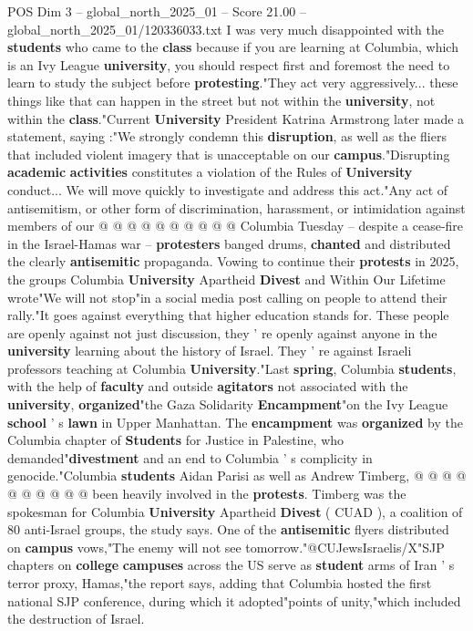 \begin{textsample}{POS Dim 3 – global\_north\_2025\_01 – Score 21.00 – global\_north\_2025\_01/120336033.txt}
I was very much disappointed with the \textbf{students} who came to the \textbf{class} because if you are learning at Columbia, which is an Ivy League \textbf{university}, you should respect first and foremost the need to learn to study the subject before \textbf{protesting}."They act very aggressively... these things like that can happen in the street but not within the \textbf{university}, not within the \textbf{class}."Current \textbf{University} President Katrina Armstrong later made a statement, saying :"We strongly condemn this \textbf{disruption}, as well as the fliers that included violent imagery that is unacceptable on our \textbf{campus}."Disrupting \textbf{academic} \textbf{activities} constitutes a violation of the Rules of \textbf{University} conduct...
We will move quickly to investigate and address this act."Any act of antisemitism, or other form of discrimination, harassment, or intimidation against members of our @ @ @ @ @ @ @ @ @ @ Columbia Tuesday -- despite a cease-fire in the Israel-Hamas war -- \textbf{protesters} banged drums, \textbf{chanted} and distributed the clearly \textbf{antisemitic} propaganda.
Vowing to continue their \textbf{protests} in 2025, the groups Columbia \textbf{University} Apartheid \textbf{Divest} and Within Our Lifetime wrote"We will not stop"in a social media post calling on people to attend their rally."It goes against everything that higher education stands for.
These people are openly against not just discussion, they ' re openly against anyone in the \textbf{university} learning about the history of Israel.
They ' re against Israeli professors teaching at Columbia \textbf{University}."Last \textbf{spring}, Columbia \textbf{students}, with the help of \textbf{faculty} and outside \textbf{agitators} not associated with the \textbf{university}, \textbf{organized}"the Gaza Solidarity \textbf{Encampment}"on the Ivy League \textbf{school} ' s \textbf{lawn} in Upper Manhattan.
The \textbf{encampment} was \textbf{organized} by the Columbia chapter of \textbf{Students} for Justice in Palestine, who demanded"\textbf{divestment} and an end to Columbia ' s complicity in genocide."Columbia \textbf{students} Aidan Parisi as well as Andrew Timberg, @ @ @ @ @ @ @ @ @ @ been heavily involved in the \textbf{protests}.
Timberg was the spokesman for Columbia \textbf{University} Apartheid \textbf{Divest} ( CUAD ), a coalition of 80 anti-Israel groups, the study says.
One of the \textbf{antisemitic} flyers distributed on \textbf{campus} vows,"The enemy will not see tomorrow."@CUJewsIsraelis/X"SJP chapters on \textbf{college} \textbf{campuses} across the US serve as \textbf{student} arms of Iran ' s terror proxy, Hamas,"the report says, adding that Columbia hosted the first national SJP conference, during which it adopted"points of unity,"which included the destruction of Israel.

\end{textsample}

